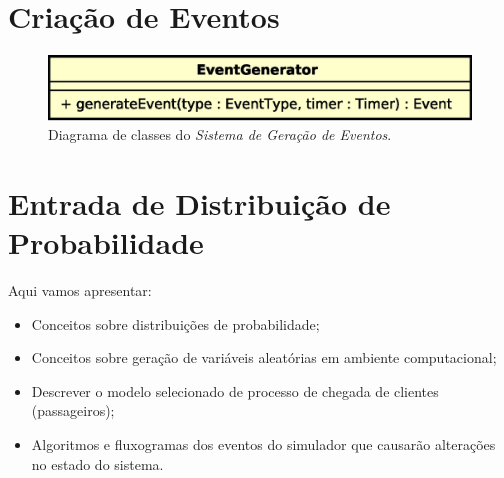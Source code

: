 \section{\label{sec:model:generator}Criação de Eventos}

\begin{figure}[htb!]
  \centering
  \includegraphics[scale=0.6]{img/EventGenerator.eps}
  \caption{Diagrama de classes do \textit{Sistema de Geração de Eventos}.}
\label{fig:diagram:generator}
\end{figure}

\section{\label{chap:input}Entrada de Distribuição de Probabilidade}

Aqui vamos apresentar:

\begin{itemize}
\item Conceitos sobre distribuições de probabilidade;
\item Conceitos sobre geração de variáveis aleatórias em ambiente computacional;
\item Descrever o modelo selecionado de processo de chegada de clientes
(passageiros);
\item Algoritmos e fluxogramas dos eventos do simulador que causarão alterações
no estado do sistema.
\end{itemize}